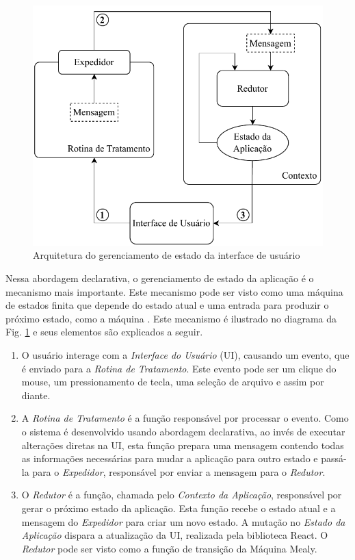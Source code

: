 \begin{figure}[!ht]
  \centering
  \includegraphics[width=0.8\linewidth]{figures/flow_front.pdf}
  \caption{Arquitetura do gerenciamento de estado da interface de usuário}
  \label{fig:arch-front}
\end{figure}

Nessa abordagem declarativa, o gerenciamento de estado da aplicação é o mecanismo mais importante. Este mecanismo pode ser visto como uma máquina de estados finita \citep{formal-methods} que depende do estado atual e uma entrada para produzir o próximo estado, como a máquina \citet{mealy}. Este mecanismo é ilustrado no diagrama da Fig. \ref{fig:arch-front} e seus elementos são explicados a seguir.

\begin{enumerate}
  \item O usuário interage com a \emph{Interface do Usuário} (UI), causando um evento, que é enviado para a \emph{Rotina de Tratamento}. Este evento pode ser um clique do mouse, um pressionamento de tecla, uma seleção de arquivo e assim por diante.
  \item A \emph{Rotina de Tratamento} é a função responsável por processar o evento. Como o sistema é desenvolvido usando abordagem declarativa, ao invés de executar alterações diretas na UI, esta função prepara uma mensagem contendo todas as informações necessárias para mudar a aplicação para outro estado e passá-la para o \emph{Expedidor}, responsável por enviar a mensagem para o \emph{Redutor}.
  \item O \emph{Redutor} é a função, chamada pelo \emph{Contexto da Aplicação}, responsável por gerar o próximo estado da aplicação. Esta função recebe o estado atual e a mensagem do \emph{Expedidor} para criar um novo estado. A mutação no \emph{Estado da Aplicação} dispara a atualização da UI, realizada pela biblioteca React. O \emph{Redutor} pode ser visto como a função de transição da Máquina Mealy.
\end{enumerate}


